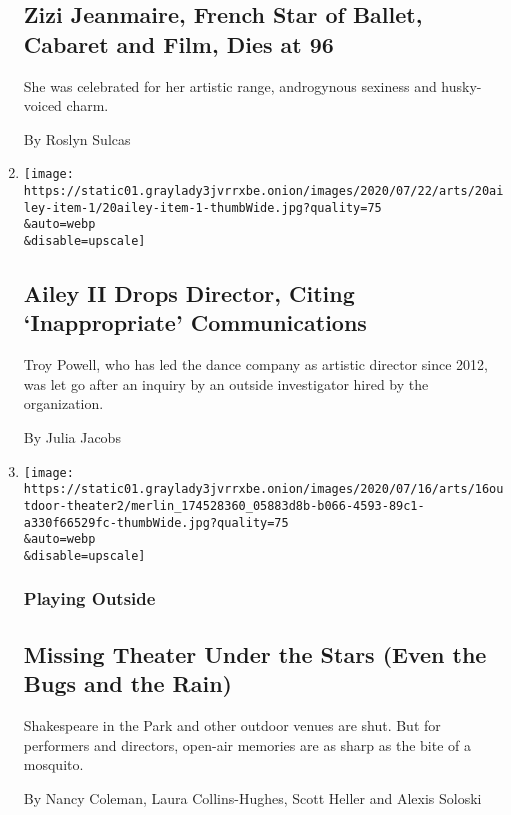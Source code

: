 \begin{enumerate}
  \hypertarget{zizi-jeanmaire-french-star-of-ballet-cabaret-and-film-dies-at-96}{%
  \subsection{Zizi Jeanmaire, French Star of Ballet, Cabaret and Film,
  Dies at
  96}\label{zizi-jeanmaire-french-star-of-ballet-cabaret-and-film-dies-at-96}}

  She was celebrated for her artistic range, androgynous sexiness and
  husky-voiced charm.

  By Roslyn Sulcas
\item
  \href{/2020/07/20/arts/dance/ailey-ii-troy-powell.html}{}

  \texttt{[image: https://static01.graylady3jvrrxbe.onion/images/2020/07/22/arts/20ailey-item-1/20ailey-item-1-thumbWide.jpg?quality=75\\\&auto=webp\\\&disable=upscale]}

  \hypertarget{ailey-ii-drops-director-citing-inappropriate-communications}{%
  \subsection{Ailey II Drops Director, Citing `Inappropriate'
  Communications}\label{ailey-ii-drops-director-citing-inappropriate-communications}}

  Troy Powell, who has led the dance company as artistic director since
  2012, was let go after an inquiry by an outside investigator hired by
  the organization.

  By Julia Jacobs
\item
  \href{/2020/07/16/theater/outdoor-theater-plays.html}{}

  \texttt{[image: https://static01.graylady3jvrrxbe.onion/images/2020/07/16/arts/16outdoor-theater2/merlin\_174528360\_05883d8b-b066-4593-89c1-a330f66529fc-thumbWide.jpg?quality=75\\\&auto=webp\\\&disable=upscale]}

  \hypertarget{playing-outside}{%
  \subsubsection{Playing Outside}\label{playing-outside}}

  \hypertarget{missing-theater-under-the-stars-even-the-bugs-and-the-rain}{%
  \subsection{Missing Theater Under the Stars (Even the Bugs and the
  Rain)}\label{missing-theater-under-the-stars-even-the-bugs-and-the-rain}}

  Shakespeare in the Park and other outdoor venues are shut. But for
  performers and directors, open-air memories are as sharp as the bite
  of a mosquito.

  By Nancy Coleman, Laura Collins-Hughes, Scott Heller and Alexis
  Soloski
\end{enumerate}

